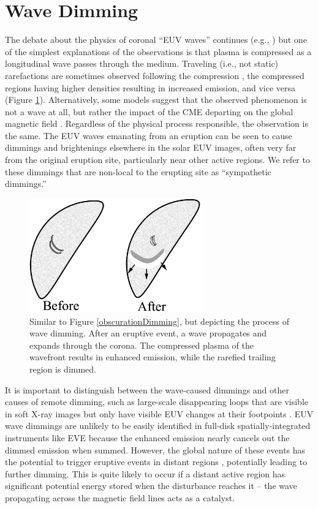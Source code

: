 \section{Wave Dimming}
\label{sec:waveDimming}
The debate about the physics of coronal “EUV waves” continues (e.g., \citet{Zhukov2004, Muhr2011, Liu2014}) but one of the simplest explanations of the observations is that plasma is compressed as a longitudinal wave passes through the medium. Traveling (i.e., not static) rarefactions are sometimes observed following the compression \citep{Muhr2011}, the compressed regions having higher densities resulting in increased emission, and vice versa (Figure \ref{waveDimming}). Alternatively, some models suggest that the observed phenomenon is not a wave at all, but rather the impact of the CME departing on the global magnetic field \citep{Chen2002, Chen2005}. Regardless of the physical process responsible, the observation is the same. The EUV waves emanating from an eruption can be seen to cause dimmings and brightenings elsewhere in the solar EUV images, often very far from the original eruption site, particularly near other active regions. We refer to these dimmings that are non-local to the erupting site as “sympathetic dimmings.”

\begin{figure}[!h]
    \caption[Schematic of obscuration dimming]{
        Similar to Figure \ref{obscurationDimming}, but depicting the process of wave dimming. After an eruptive event, a 
        wave propagates and expands through the corona. The compressed plasma of the wavefront results in enhanced emission,
        while the rarefied trailing region is dimmed. 
    }
    \begin{center}
        \includegraphics[width=75mm]{Images/WaveDimming.png}
    \end{center}
    \label{waveDimming}
\end{figure}

It is important to distinguish between the wave-caused dimmings and other causes of remote dimming, such as large-scale disappearing loops that are visible in soft X-ray images but only have visible EUV changes at their footpoints \citep{Pohjolainen2005}. EUV wave dimmings are unlikely to be easily identified in full-disk spatially-integrated instruments like EVE because the enhanced emission nearly cancels out the dimmed emission when summed. However, the global nature of these events has the potential to trigger eruptive events in distant regions \citep{Schrijver2015}, potentially leading to further dimming. This is quite likely to occur if a distant active region has significant potential energy stored when the disturbance reaches it -- the wave propagating across the magnetic field lines acts as a catalyst. 

